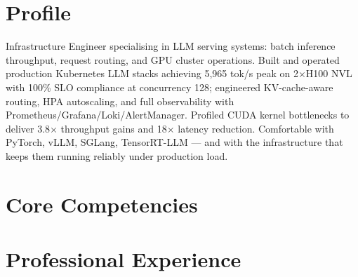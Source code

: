 \documentclass[11pt,a4paper]{moderncv}
\begin{document}
\makecvtitle

\section{Profile}
Infrastructure Engineer specialising in LLM serving systems: batch inference throughput, request routing, and GPU cluster operations. Built and operated production Kubernetes LLM stacks achieving 5,965 tok/s peak on 2$\times$H100 NVL with 100\% SLO compliance at concurrency 128; engineered KV-cache-aware routing, HPA autoscaling, and full observability with Prometheus/Grafana/Loki/AlertManager. Profiled CUDA kernel bottlenecks to deliver 3.8$\times$ throughput gains and 18$\times$ latency reduction. Comfortable with PyTorch, vLLM, SGLang, TensorRT-LLM — and with the infrastructure that keeps them running reliably under production load.

\section{Core Competencies}

\section{Professional Experience}
\end{document}
